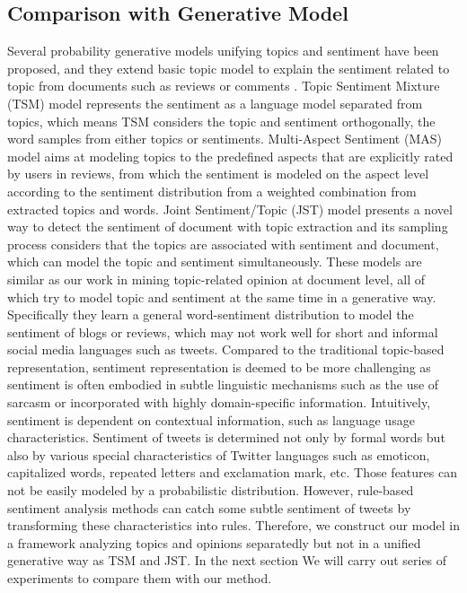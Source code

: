 \documentclass[runningheads,a4paper]{llncs}
\begin{document}
\subsection{Comparison with Generative Model}
\label{comparison}

Several probability generative models unifying topics and sentiment have been proposed, and they extend basic topic model to explain the sentiment related to topic from documents such as reviews or comments \cite{mei2007topic,lin2009joint,zhao2012user}. Topic Sentiment Mixture (TSM) model \cite{mei2007topic} represents the sentiment as a language model separated from topics, which means TSM considers the topic and sentiment orthogonally, the word samples from either topics or sentiments. Multi-Aspect Sentiment (MAS) model \cite{zhao2012user} aims at modeling topics to the predefined aspects that are explicitly rated by users in reviews, from which the sentiment is modeled on the aspect level according to the sentiment distribution from a weighted combination from extracted topics and words. Joint Sentiment/Topic (JST) model \cite{lin2009joint} presents a novel way to detect the sentiment of document with topic extraction and its sampling process considers that the topics are associated with sentiment and document, which can model the topic and sentiment simultaneously. These models are similar as our work in mining topic-related opinion at document level, all of which try to model topic and sentiment at the same time in a generative way. Specifically they learn a general word-sentiment distribution to model the sentiment of blogs or reviews, which may not work well for short and informal social media languages such as tweets. Compared to the traditional topic-based representation, sentiment representation is deemed to be more challenging as sentiment is often embodied in subtle linguistic mechanisms such as the use of sarcasm or incorporated with highly domain-specific information. Intuitively, sentiment is dependent on contextual information, such as language usage characteristics. Sentiment of tweets is determined not only by formal words but also by various special characteristics of Twitter languages such as emoticon, capitalized words, repeated letters and exclamation mark, etc. Those features can not be easily modeled by a probabilistic distribution.  However, rule-based sentiment analysis methods can catch some subtle sentiment of tweets by transforming these characteristics into rules. Therefore, we construct our model in a framework analyzing topics and opinions separatedly but not in a unified generative way as TSM and JST. In the next section We will carry out series of experiments to compare them with our method.
\end{document}
